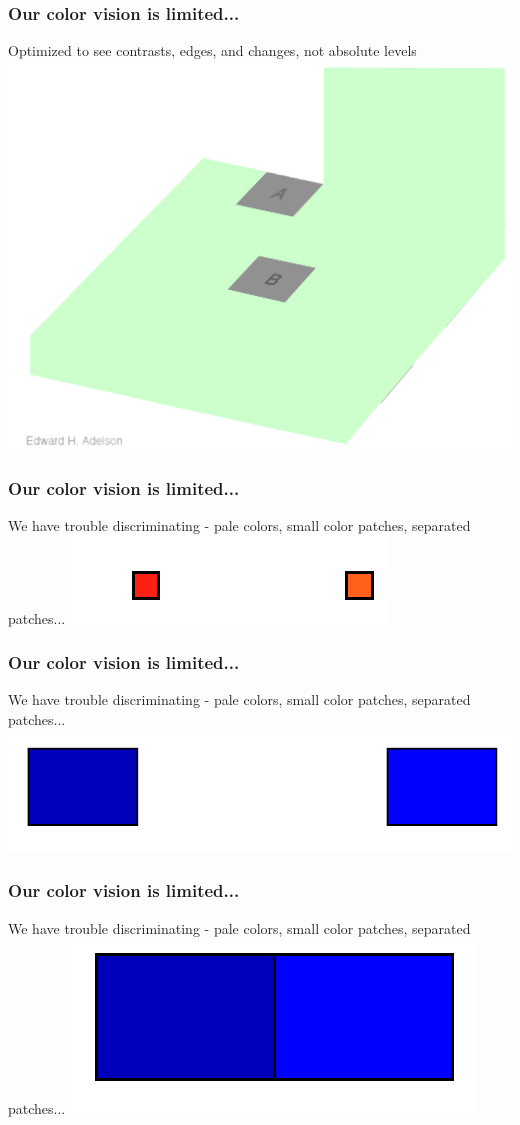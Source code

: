 \documentclass{beamer}
\begin{document}
\begin{frame}
\frametitle{Our color vision is limited...}
Optimized to see contrasts, edges, and changes, not absolute levels
\centering
\includegraphics[width=0.6\linewidth]{image/vision3}
\end{frame}

\begin{frame}
\frametitle{Our color vision is limited...}
We have trouble discriminating - pale colors, small color patches, separated patches...
\vfill
\centering
\includegraphics[width=0.2\linewidth]{image/vision4}
\end{frame}

\begin{frame}
\frametitle{Our color vision is limited...}
We have trouble discriminating - pale colors, small color patches, separated patches...
\vfill
\centering
\includegraphics[width=0.5\linewidth]{image/vision5}
\end{frame}

\begin{frame}
\frametitle{Our color vision is limited...}
We have trouble discriminating - pale colors, small color patches, separated patches...
\vfill
\centering
\includegraphics[width=0.3\linewidth]{image/vision6}
\end{frame}
\end{document}
